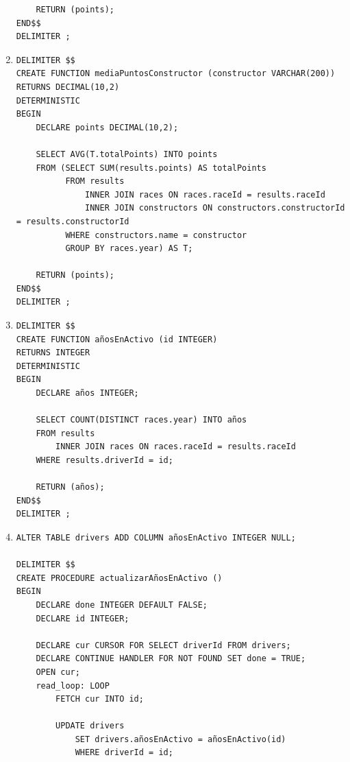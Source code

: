 \documentclass[a4paper]{article}
\begin{document}
\begin{enumerate}
\begin{verbatim}
    RETURN (points);
END$$
DELIMITER ;
    \end{verbatim}
    
    \item
    \begin{verbatim}
DELIMITER $$
CREATE FUNCTION mediaPuntosConstructor (constructor VARCHAR(200))
RETURNS DECIMAL(10,2)
DETERMINISTIC
BEGIN
	DECLARE points DECIMAL(10,2);

    SELECT AVG(T.totalPoints) INTO points
    FROM (SELECT SUM(results.points) AS totalPoints
          FROM results
              INNER JOIN races ON races.raceId = results.raceId
              INNER JOIN constructors ON constructors.constructorId = results.constructorId
          WHERE constructors.name = constructor
          GROUP BY races.year) AS T;
          
    RETURN (points);
END$$
DELIMITER ;
    \end{verbatim}
    
    \item
    \begin{verbatim}
DELIMITER $$
CREATE FUNCTION añosEnActivo (id INTEGER)
RETURNS INTEGER
DETERMINISTIC
BEGIN
	DECLARE años INTEGER;

    SELECT COUNT(DISTINCT races.year) INTO años 
    FROM results
    	INNER JOIN races ON races.raceId = results.raceId
    WHERE results.driverId = id;
          
    RETURN (años);
END$$
DELIMITER ;
    \end{verbatim}
    
    \item
    \begin{verbatim}
ALTER TABLE drivers ADD COLUMN añosEnActivo INTEGER NULL;

DELIMITER $$
CREATE PROCEDURE actualizarAñosEnActivo ()
BEGIN
    DECLARE done INTEGER DEFAULT FALSE;
    DECLARE id INTEGER;
    
    DECLARE cur CURSOR FOR SELECT driverId FROM drivers;
    DECLARE CONTINUE HANDLER FOR NOT FOUND SET done = TRUE;
    OPEN cur;
    read_loop: LOOP
        FETCH cur INTO id;
        
        UPDATE drivers
            SET drivers.añosEnActivo = añosEnActivo(id)
            WHERE driverId = id;
            

\end{verbatim}
\end{enumerate}
\end{document}
